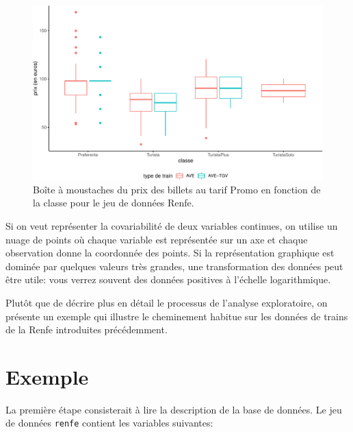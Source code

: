 \documentclass[
  11pt,
  letterpaper,
]{book}
\theoremstyle{definition}
\theoremstyle{remark}
\begin{document}
\begin{figure}[ht!]

{\centering \includegraphics[width=1\textwidth,height=\textheight]{./01-analyseexploratoire_files/figure-pdf/fig-histboxplot-1.pdf}

}

\caption{\label{fig-histboxplot}Boîte à moustaches du prix des billets
au tarif Promo en fonction de la classe pour le jeu de données Renfe.}

\end{figure}

Si on veut représenter la covariabilité de deux variables continues, on
utilise un nuage de points où chaque variable est représentée sur un axe
et chaque observation donne la coordonnée des points. Si la
représentation graphique est dominée par quelques valeurs très grandes,
une transformation des données peut être utile: vous verrez souvent des
données positives à l'échelle logarithmique.

Plutôt que de décrire plus en détail le processus de l'analyse
exploratoire, on présente un exemple qui illustre le cheminement habitue
sur les données de trains de la Renfe introduites précédemment.

\hypertarget{exemple}{%
\section{Exemple}\label{exemple}}

La première étape consisterait à lire la description de la base de
données. Le jeu de données \texttt{renfe} contient les variables
suivantes:
\end{document}
